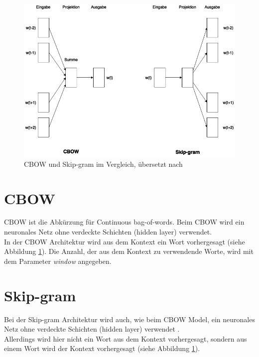 \documentclass[12pt,a4paper]{report}
\begin{document}
\begin{figure}[h]
  \begin{center}
	\includegraphics[scale=0.55]{CBOWvsSkip-gram.png}
  \end{center}  
  \caption{CBOW und Skip-gram im Vergleich, übersetzt nach \cite{DBLP:journals/corr/abs-1301-3781}}
  \label{cbowvsskipgram}
\end{figure}

\section{CBOW}
\label{sec:cbow}
	CBOW ist die Abkürzung für Continuous bag-of-words. Beim CBOW wird ein neuronales Netz ohne verdeckte Schichten (hidden layer) verwendet\cite{DBLP:journals/corr/abs-1301-3781}.\\
	In der CBOW Architektur wird aus dem Kontext ein Wort vorhergesagt (siehe Abbildung \ref{cbowvsskipgram}). Die Anzahl, der aus dem Kontext zu verwendende Worte, wird mit dem Parameter \textit{window} angegeben.\\
	
	\section{Skip-gram}
\label{sec:skipgram}
	Bei der Skip-gram Architektur wird auch, wie beim CBOW Model, ein neuronales Netz ohne verdeckte Schichten (hidden layer) verwendet \citep{DBLP:journals/corr/abs-1301-3781}.\\
	Allerdings wird hier nicht ein Wort aus dem Kontext vorhergesagt, sondern aus einem Wort wird der Kontext vorhergesagt (siehe Abbildung \ref{cbowvsskipgram}).\\
	
\end{document}
